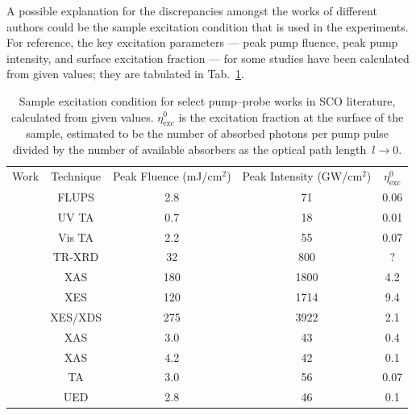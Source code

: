 A possible explanation for the discrepancies amongst the works of different authors
could be the sample excitation condition that is used in the experiments.
For reference, the key excitation parameters --- peak pump fluence, peak pump intensity,
and surface excitation fraction --- for some studies have been calculated from given values;
they are tabulated in Tab.~\ref{tab: SCO-exc}.
%
\begin{table}[ht!]
  \centering
  {\renewcommand*{\arraystretch}{1.5}
    \begin{tabular}{ c c c c c}
      \toprule
      \multirow{2}{*}{Work} & \multirow{2}{*}{Technique}
        & \multirow{2}{*}{
          \begin{minipage}[c]{2.75cm} \centering Peak Fluence (mJ/cm$^2$) \end{minipage}}
        & \multirow{2}{*}{
         \begin{minipage}[c]{2.75cm} \centering Peak Intensity (GW/cm$^2$) \end{minipage}}
        & \multirow{2}{*}{$\eta_\text{exc}^0$} \\
        & & & & \\
      \midrule
      \cite{Gawelda2007a}  & FLUPS     & 2.8      & 71         & 0.06      \\
      \cite{Aubock2015}    & UV TA     & 0.7      & 18         & 0.01      \\
      \cite{Aubock2015}    & Vis TA    & 2.2      & 55         & 0.07      \\
      \cite{Freyer2013}    & TR-XRD    & 32       & 800        & ?         \\
      \cite{Gawelda2007b}  & XAS       & 180      & 1800       & 4.2       \\
      \cite{Zhang2014}     & XES       & 120      & 1714       & 9.4       \\
      \cite{Haldrup2016}   & XES/XDS   & 275      & 3922       & 2.1       \\
      \cite{Huse2011}      & XAS       & 3.0      & 43         & 0.4       \\
      \cite{VanKuiken2016} & XAS       & 4.2      & 42         & 0.1       \\
      \hdashline
      \cite{Field2016}     & TA        & 3.0      & 56         & 0.07      \\
      \cite{Jiang2017}     & UED       & 2.8      & 46         & 0.1       \\
      \bottomrule
    \end{tabular}
  }
  \caption{Sample excitation condition for select pump--probe works in SCO literature,
    calculated from given values.
    $\eta_\text{exc}^0$ is the excitation fraction at the surface of the sample,
    estimated to be the number of absorbed photons per pump pulse divided by
    the number of available absorbers as the optical path length~$l \to 0$.
    }
  \label{tab: SCO-exc}
\end{table}
